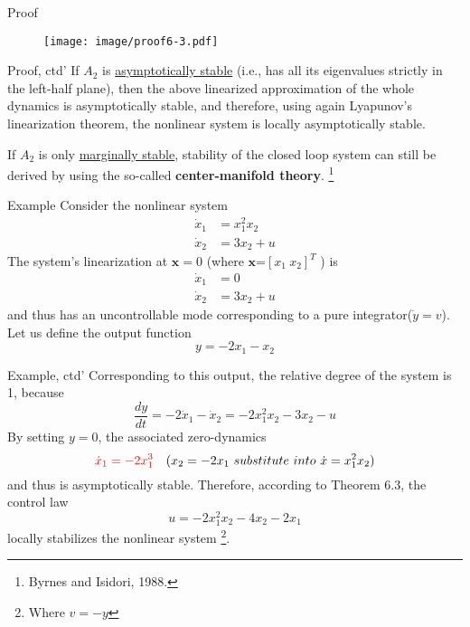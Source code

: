 \documentclass{beamer}
\renewcommand{\vec}[1]{\ensuremath{\boldsymbol{#1}}} %
\begin{document}
\begin{frame}{Proof}
    \begin{figure}
      \centering
      \texttt{[image: image/proof6-3.pdf]}
    \end{figure}
\end{frame}
\begin{frame}{Proof, ctd'}
    If $A_{2}$ is \underline{asymptotically stable} (i.e., has all its eigenvalues strictly in the left-half plane), then the above linearized approximation of the whole dynamics is asymptotically stable, and therefore, using again Lyapunov's linearization theorem, the nonlinear system is locally asymptotically stable.

    \vspace{+10pt}
    If $A_{2}$ is only \underline{marginally stable}, stability of the closed loop system can still be derived by using the so-called \textbf{center-manifold theory}. \footnote{Byrnes and Isidori, 1988.}
\end{frame}


\begin{frame}{Example}
    Consider the nonlinear system
    \begin{equation}\label{example6-14}
      \begin{aligned}
        \dot{x}_{1} &= x_{1}^{2} x_{2} \\
        \dot{x}_{2} &= 3 x_{2}+u
      \end{aligned}
    \end{equation}
    The system's linearization at $\vec{x} = 0$ (where \vec{x}=$\left[x_{1}~x_{2}\right]^{T}$ ) is
    \begin{equation}\nonumber
      \begin{aligned}
        \dot{x}_{1} &= 0 \\
        \dot{x}_{2} &= 3 x_{2}+u
      \end{aligned}
    \end{equation}
    and thus has an {\color{red}uncontrollable mode} corresponding to a pure integrator($\dot{y}=v$).\\
    Let us define the output function
    \begin{equation}
      y=-2x_{1}-x_{2}
    \end{equation}
\end{frame}
\begin{frame}{Example, ctd'}
    Corresponding to this output, the relative degree of the system is 1, because
    $$
    \frac{d y}{d t}=-2 \dot{x}_{1}-\dot{x}_{2}=-2 x_{1}^{2} x_{2}-3 x_{2}-u
    $$
    By setting $y=0$, the associated zero-dynamics
    $$ {\color{red}\dot{x}_{1} = -2x_{1}^{3}} \quad (x_{2}=-2x_{1}~substitute~into~ \dot{x}=x_{1}^{2}x_{2})$$
    and thus is asymptotically stable. Therefore, according to Theorem 6.3, the
    control law
    $$ u=-2 x_{1}^{2} x_{2}-4 x_{2}-2 x_{1} $$
    locally stabilizes the nonlinear system \footnote{Where $v=-y$}.
\end{frame}
\end{document}
